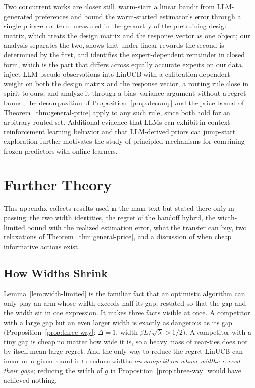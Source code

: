 \documentclass{article}
\theoremstyle{definition}
\theoremstyle{remark}
\theoremstyle{remark}
\begin{document}
Two concurrent works are closer still. \cite{jumpstart2026} warm-start a linear
bandit from LLM-generated preferences and bound the warm-started estimator's
error through a single prior-error term measured in the geometry of the
pretraining design matrix, which treats the design matrix and the response
vector as one object; our analysis separates the two, shows that under linear
rewards the second is determined by the first, and identifies the
expert-dependent remainder in closed form, which is the part that differs
across equally accurate experts on our data. \cite{calibgated2026} inject LLM
pseudo-observations into LinUCB with a calibration-dependent weight on both the
design matrix and the response vector, a routing rule close in spirit to ours,
and analyze it through a bias--variance argument without a regret bound; the
decomposition of Proposition~\ref{prop:decomp} and the price bound of
Theorem~\ref{thm:general-price} apply to any such rule, since both hold for an
arbitrary routed set. Additional evidence that LLMs can
exhibit in-context reinforcement learning behavior
\cite{monea2024llms,krishnamurthy2024can} and that LLM-derived priors can
jump-start exploration \cite{alamdari2024jumpstarting,abbasiyadkori2024believe}
further motivates the study of principled mechanisms for combining frozen
predictors with online learners.


\section{Further Theory}
\label{app:extra-theory}

This appendix collects results used in the main text but stated there only in
passing: the two width identities, the regret of the handoff hybrid, the
width-limited bound with the realized estimation error, what the transfer can
buy, two relaxations of Theorem~\ref{thm:general-price}, and a discussion of
when cheap informative actions exist.

\subsection{How Widths Shrink}
\label{app:widths}

Lemma~\ref{lem:width-limited} is the familiar fact that an optimistic algorithm can only play an
arm whose width exceeds half its gap, restated so that the gap and the width
sit in one expression. It makes three facts visible at once. A competitor with
a large gap but an even larger width is exactly as dangerous as its gap
(Proposition~\ref{prop:three-way}: $\Delta=1$, width $\beta L/\sqrt\lambda>1/2$).
A competitor with a tiny gap is cheap no matter how wide it is, so a heavy
mass of near-ties does not by itself mean large regret. And the only way to
reduce the regret LinUCB can incur on a given round is to reduce widths
\emph{on competitors whose widths exceed their gaps}; reducing the width of
$g$ in Proposition~\ref{prop:three-way} would have achieved nothing.
\end{document}
